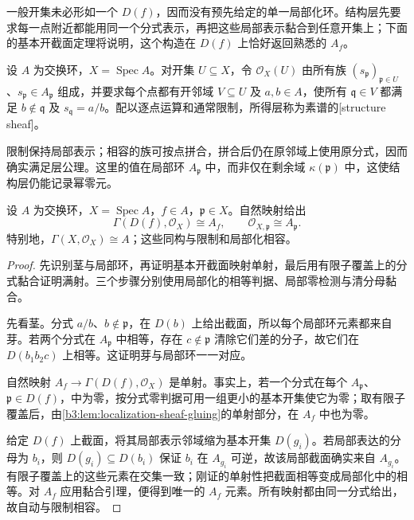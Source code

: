 \ProseParagraphBreak
一般开集未必形如一个 \(D(f)\)，因而没有预先给定的单一局部化环。结构层先要求每一点附近都能用同一个分式表示，再把这些局部表示黏合到任意开集上；下面的基本开截面定理将说明，这个构造在 \(D(f)\) 上恰好返回熟悉的 \(A_f\)。

\begin{definition}\label{b3:def:affine-structure-sheaf}
	设 \(A\) 为交换环，\(X=\operatorname{Spec}A\)。对开集 \(U\subseteq X\)，令 \(\mathcal O_X(U)\) 由所有族 \((s_{\mathfrak p})_{\mathfrak p\in U}\)、\(s_{\mathfrak p}\in A_{\mathfrak p}\) 组成，并要求每个点都有开邻域 \(V\subseteq U\) 及 \(a,b\in A\)，使所有 \(\mathfrak q\in V\) 都满足 \(b\notin\mathfrak q\) 及 \(s_{\mathfrak q}=a/b\)。配以逐点运算和通常限制，所得层称为素谱的[structure sheaf]。
\end{definition}

限制保持局部表示；相容的族可按点拼合，拼合后仍在原邻域上使用原分式，因而确实满足层公理。这里的值在局部环 \(A_{\mathfrak p}\) 中，而非仅在剩余域 \(\kappa(\mathfrak p)\) 中，这使结构层仍能记录幂零元。

\begin{theorem}\label{b3:thm:affine-sheaf-sections}
	设 \(A\) 为交换环，\(X=\operatorname{Spec}A\)，\(f\in A\)，\(\mathfrak p\in X\)。自然映射给出
	\[
		\Gamma(D(f),\mathcal O_X)\cong A_f,\qquad \mathcal O_{X,\mathfrak p}\cong A_{\mathfrak p}.
	\]
	特别地，\(\Gamma(X,\mathcal O_X)\cong A\)；这些同构与限制和局部化相容。
\end{theorem}
\begin{proof}
	先识别茎与局部环，再证明基本开截面映射单射，最后用有限子覆盖上的分式黏合证明满射。三个步骤分别使用局部化的相等判据、局部零检测与清分母黏合。

	先看茎。分式 \(a/b\)、\(b\notin\mathfrak p\)，在 \(D(b)\) 上给出截面，所以每个局部环元素都来自芽。若两个分式在 \(A_{\mathfrak p}\) 中相等，存在 \(c\notin\mathfrak p\) 清除它们差的分子，故它们在 \(D(b_1b_2c)\) 上相等。这证明芽与局部环一一对应。

	自然映射 \(A_f\rightarrow\Gamma(D(f),\mathcal O_X)\) 是单射。事实上，若一个分式在每个 \(A_{\mathfrak p}\)、\(\mathfrak p\in D(f)\)，中为零，按分式零判据可用一组更小的基本开集使它为零；取有限子覆盖后，由\cref{b3:lem:localization-sheaf-gluing}的单射部分，在 \(A_f\) 中也为零。

	给定 \(D(f)\) 上截面，将其局部表示邻域缩为基本开集 \(D(g_i)\)。若局部表达的分母为 \(b_i\)，则 \(D(g_i)\subseteq D(b_i)\) 保证 \(b_i\) 在 \(A_{g_i}\) 可逆，故该局部截面确实来自 \(A_{g_i}\)。有限子覆盖上的这些元素在交集一致；刚证的单射性把截面相等变成局部化中的相等。对 \(A_f\) 应用黏合引理，便得到唯一的 \(A_f\) 元素。所有映射都由同一分式给出，故自动与限制相容。
\end{proof}

